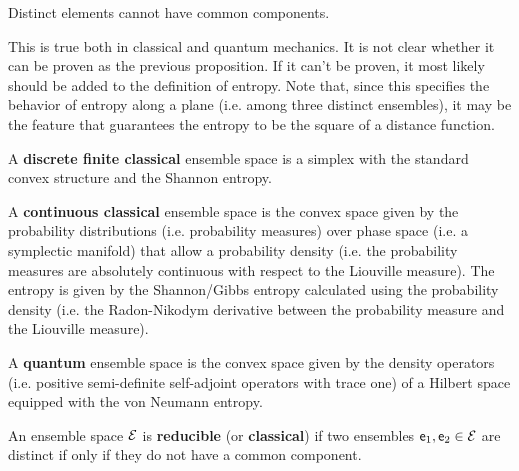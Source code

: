 \begin{conj}
	Distinct elements cannot have common components.
\end{conj}

\begin{remark}
	This is true both in classical and quantum mechanics. It is not clear whether it can be proven as the previous proposition. If it can't be proven, it most likely should be added to the definition of entropy. Note that, since this specifies the behavior of entropy along a plane (i.e. among three distinct ensembles), it may be the feature that guarantees the entropy to be the square of a distance function.
\end{remark}


\begin{defn}
	A \textbf{discrete finite classical} ensemble space is a simplex with the standard convex structure and the Shannon entropy.
\end{defn}

\begin{defn}
	A \textbf{continuous classical} ensemble space is the convex space given by the probability distributions (i.e. probability measures) over phase space (i.e. a symplectic manifold) that allow a probability density (i.e. the probability measures are absolutely continuous with respect to the Liouville measure). The entropy is given by the Shannon/Gibbs entropy calculated using the probability density (i.e. the Radon-Nikodym derivative between the probability measure and the Liouville measure).
\end{defn}

\begin{defn}
	A \textbf{quantum} ensemble space is the convex space given by the density operators (i.e. positive semi-definite self-adjoint operators with trace one) of a Hilbert space equipped with the von Neumann entropy.
\end{defn}

\begin{defn}
	An ensemble space $\mathcal{E}$ is \textbf{reducible} (or \textbf{classical}) if two ensembles $\mathsf{e}_1, \mathsf{e}_2 \in \mathcal{E}$ are distinct if only if they do not have a common component.
\end{defn}

